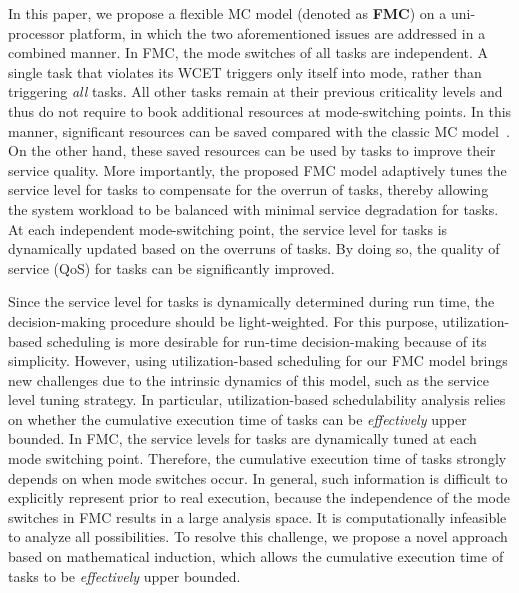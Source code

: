 \documentclass[10pt,journal,compsoc]{IEEEtran}
\begin{document}
In this paper, we propose a flexible MC model (denoted as \textbf{FMC}) on a uni-processor platform, in which the two aforementioned issues are addressed in a combined manner. In FMC, the mode switches of all \hi tasks are independent. A single \hi task that violates its \lo WCET triggers only itself into \hi mode, rather than triggering \textit{all} \hi tasks. All other \hi tasks remain at their previous criticality levels and thus do not require to book additional resources at mode-switching points. In this manner, significant resources can be saved compared with the classic MC model~\cite{Baruah2010,Baruah2011,Baruah2011RTSS}. On the other hand, these saved resources can be used by \lo tasks to improve their service quality. More importantly, the proposed FMC model adaptively tunes the service level for \lo tasks to compensate for the overrun of \hi tasks, thereby allowing the system workload to be balanced with minimal service degradation for \lo tasks. At each independent mode-switching point, the service level for \lo tasks is dynamically updated based on the overruns of \hi tasks. By doing so, the quality of service (QoS) for \lo tasks can be significantly improved. 

Since the service level for \lo tasks is dynamically determined during run time, the decision-making procedure should be light-weighted. For this purpose, utilization-based scheduling is more desirable for run-time decision-making because of its simplicity. However, using utilization-based scheduling for our FMC model brings new challenges due to the intrinsic dynamics of this model, such as the service level tuning strategy. In particular, utilization-based schedulability analysis relies on whether the cumulative execution time of \lo tasks can be \textit{effectively} upper bounded. In FMC, the service levels for \lo tasks are dynamically tuned at each mode switching point. Therefore, the cumulative execution time of \lo tasks strongly depends on when mode switches occur. In general, such information is difficult to explicitly represent prior to real execution, because the independence of the mode switches in FMC results in a large analysis space. It is computationally infeasible to analyze all possibilities. To resolve this challenge, we propose a novel approach based on mathematical induction, which allows the cumulative execution time of \lo tasks to be \textit{effectively} upper bounded.   
\end{document}
